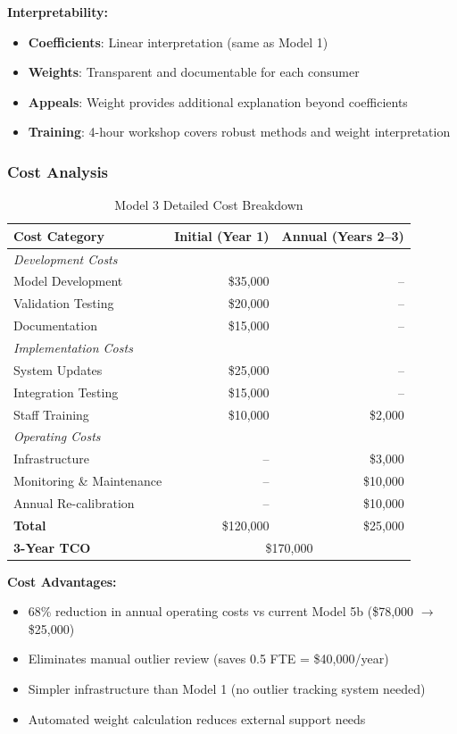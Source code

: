 \textbf{Interpretability:}
\begin{itemize}
    \item \textbf{Coefficients}: Linear interpretation (same as Model 1)
    \item \textbf{Weights}: Transparent and documentable for each consumer
    \item \textbf{Appeals}: Weight provides additional explanation beyond coefficients
    \item \textbf{Training}: 4-hour workshop covers robust methods and weight interpretation
\end{itemize}

\subsubsection{Cost Analysis}

\begin{table}[h]
\centering
\caption{Model 3 Detailed Cost Breakdown}
\begin{tabular}{lrr}
\toprule
\textbf{Cost Category} & \textbf{Initial (Year 1)} & \textbf{Annual (Years 2--3)} \\
\midrule
\multicolumn{3}{l}{\textit{Development Costs}} \\
Model Development & \$35,000 & -- \\
Validation Testing & \$20,000 & -- \\
Documentation & \$15,000 & -- \\
\midrule
\multicolumn{3}{l}{\textit{Implementation Costs}} \\
System Updates & \$25,000 & -- \\
Integration Testing & \$15,000 & -- \\
Staff Training & \$10,000 & \$2,000 \\
\midrule
\multicolumn{3}{l}{\textit{Operating Costs}} \\
Infrastructure & -- & \$3,000 \\
Monitoring \& Maintenance & -- & \$10,000 \\
Annual Re-calibration & -- & \$10,000 \\
\midrule
\textbf{Total} & \$120,000 & \$25,000 \\
\textbf{3-Year TCO} & \multicolumn{2}{c}{\$170,000} \\
\bottomrule
\end{tabular}
\end{table}

\textbf{Cost Advantages:}
\begin{itemize}
    \item 68\% reduction in annual operating costs vs current Model 5b (\$78,000 $\rightarrow$ \$25,000)
    \item Eliminates manual outlier review (saves 0.5 FTE = \$40,000/year)
    \item Simpler infrastructure than Model 1 (no outlier tracking system needed)
    \item Automated weight calculation reduces external support needs
\end{itemize}

